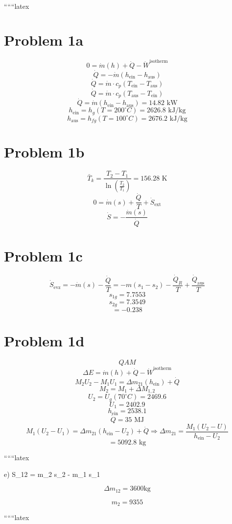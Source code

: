 
``````latex

\section*{Problem 1a}
\[
0 = \dot{m}(h) + \dot{Q} - \dot{W}^{\text{isotherm}}
\]
\[
\dot{Q} = -\dot{m}(h_{\text{ein}} - h_{\text{aus}})
\]
\[
\dot{Q} = \dot{m} \cdot c_p (T_{\text{ein}} - T_{\text{aus}})
\]
\[
\dot{Q} = \dot{m} \cdot c_p (T_{\text{aus}} - T_{\text{ein}})
\]
\[
\dot{Q} = \dot{m}(h_{\text{ein}} - h_{\text{aus}}) = \boxed{14.82 \text{ kW}}
\]
\[
h_{\text{ein}} = h_g(T = 200^\circ C) = 2626.8 \text{ kJ/kg}
\]
\[
h_{\text{aus}} = h_{fg}(T = 100^\circ C) = 2676.2 \text{ kJ/kg}
\]

\section*{Problem 1b}
\[
\bar{T}_k = \frac{T_2 - T_1}{\ln \left( \frac{T_2}{T_1} \right)} = \boxed{156.28 \text{ K}}
\]
\[
0 = \dot{m}(s) + \frac{\dot{Q}}{T} + \dot{S}_{\text{ext}}
\]
\[
\dot{S} = -\frac{\dot{m}(s)}{\dot{Q}}
\]

\section*{Problem 1c}
\[
\dot{S}_{\text{evz}} = -\dot{m}(s) - \frac{\dot{Q}}{T} = -m(s_1 - s_2) - \frac{\dot{Q}_R}{T} + \frac{\dot{Q}_{\text{aus}}}{T}
\]
\[
s_{1g} = 7.7553
\]
\[
s_{2g} = 7.3549
\]
\[
= -0.238
\]

\section*{Problem 1d}
\[
QAM
\]
\[
\Delta E = \dot{m}(h) + \dot{Q} - \dot{W}^{\text{isotherm}}
\]
\[
M_2 U_2 - M_1 U_1 = \Delta m_{21} (h_{\text{ein}}) + \dot{Q}
\]
\[
M_2 = M_1 + \Delta M_{1,2}
\]
\[
U_2 = U_g(70^\circ C) = 2469.6
\]
\[
U_1 = 2402.9
\]
\[
h_{\text{ein}} = 2538.1
\]
\[
\dot{Q} = 35 \text{ MJ}
\]
\[
M_1 (U_2 - U_1) = \Delta m_{21} (h_{\text{ein}} - U_2) + \dot{Q} \Rightarrow \Delta m_{21} = \frac{M_1 (U_2 - U)}{h_{\text{ein}} - U_2}
\]
\[
= 5092.8 \text{ kg}
\]

``````latex

e) \quad \Delta S_{12} = m_2 s_2 - m_1 s_1

\[
\Delta m_{12} = 3600 \text{kg}
\]

\[
m_2 = 9355
\]

``````latex


